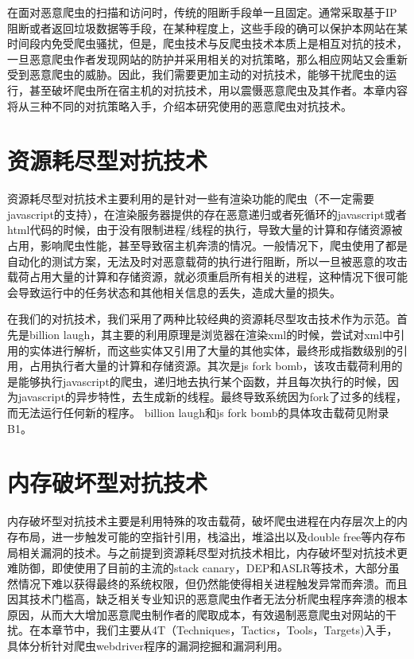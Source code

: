 \documentclass[doctor,privacy,twoside]{buaa_mac}
\begin{document}
在面对恶意爬虫的扫描和访问时，传统的阻断手段单一且固定。通常采取基于IP阻断或者返回垃圾数据等手段，在某种程度上，这些手段的确可以保护本网站在某时间段内免受爬虫骚扰，但是，爬虫技术与反爬虫技术本质上是相互对抗的技术，一旦恶意爬虫作者发现网站的防护并采用相关的对抗策略，那么相应网站又会重新受到恶意爬虫的威胁。因此，我们需要更加主动的对抗技术，能够干扰爬虫的运行，甚至破坏爬虫所在宿主机的对抗技术，用以震慑恶意爬虫及其作者。本章内容将从三种不同的对抗策略入手，介绍本研究使用的恶意爬虫对抗技术。

\section{资源耗尽型对抗技术}
资源耗尽型对抗技术主要利用的是针对一些有渲染功能的爬虫（不一定需要javascript的支持），在渲染服务器提供的存在恶意递归或者死循环的javascript或者html代码的时候，由于没有限制进程/线程的执行，导致大量的计算和存储资源被占用，影响爬虫性能，甚至导致宿主机奔溃的情况。一般情况下，爬虫使用了都是自动化的测试方案，无法及时对恶意载荷的执行进行阻断，所以一旦被恶意的攻击载荷占用大量的计算和存储资源，就必须重启所有相关的进程，这种情况下很可能会导致运行中的任务状态和其他相关信息的丢失，造成大量的损失。

在我们的对抗技术，我们采用了两种比较经典的资源耗尽型攻击技术作为示范。首先是billion laugh，其主要的利用原理是浏览器在渲染xml的时候，尝试对xml中引用的实体进行解析，而这些实体又引用了大量的其他实体，最终形成指数级别的引用，占用执行者大量的计算和存储资源。其次是js fork bomb，该攻击载荷利用的是能够执行javascript的爬虫，递归地去执行某个函数，并且每次执行的时候，因为javascript的异步特性，去生成新的线程。最终导致系统因为fork了过多的线程，而无法运行任何新的程序。 billion laugh和js fork bomb的具体攻击载荷见附录B1。


\section{内存破坏型对抗技术}
内存破坏型对抗技术主要是利用特殊的攻击载荷，破坏爬虫进程在内存层次上的内存布局，进一步触发可能的空指针引用，栈溢出，堆溢出以及double free等内存布局相关漏洞的技术。与之前提到资源耗尽型对抗技术相比，内存破坏型对抗技术更难防御，即使使用了目前的主流的stack canary，DEP和ASLR等技术，大部分虽然情况下难以获得最终的系统权限，但仍然能使得相关进程触发异常而奔溃。而且因其技术门槛高，缺乏相关专业知识的恶意爬虫作者无法分析爬虫程序奔溃的根本原因，从而大大增加恶意爬虫制作者的爬取成本，有效遏制恶意爬虫对网站的干扰。在本章节中，我们主要从4T（Techniques，Tactics，Tools，Targets)入手，具体分析针对爬虫webdriver程序的漏洞挖掘和漏洞利用。
\end{document}

